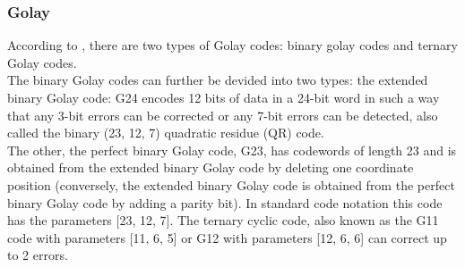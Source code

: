 \subsubsection{Golay}
According to \cite{Golay_Wikipedia}, there are two types of Golay codes: binary golay codes and ternary Golay codes. \\
The binary Golay codes can further be devided into two types: the extended binary Golay code: G24 encodes 12 bits of data in a 24-bit word in such a way that any 3-bit errors can be corrected or any 7-bit errors can be detected, also called the binary (23, 12, 7) quadratic residue (QR) code.\\
The other, the perfect binary Golay code, G23, has codewords of length 23 and is obtained from the extended binary Golay code by deleting one coordinate position (conversely, the extended binary Golay code is obtained from the perfect binary Golay code by adding a parity bit). In standard code notation this code has the parameters [23, 12, 7].
The ternary cyclic code, also known as the G11 code with parameters [11, 6, 5] or G12 with parameters [12, 6, 6] can correct up to 2 errors.
%
%
%
